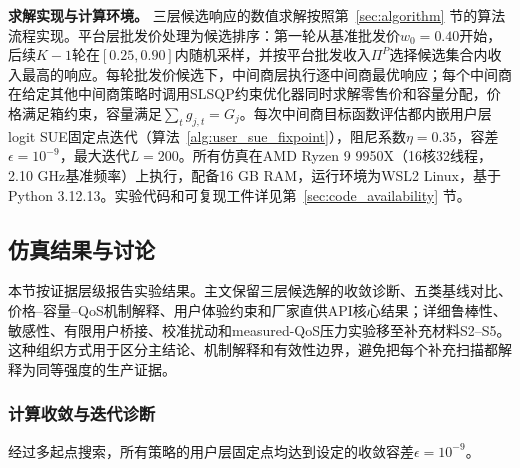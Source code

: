 \documentclass[UTF8,11pt]{ctexart}
\begin{document}
\begin{table}[H]
\centering
\caption{移除中间商层的二层集中优化基准与三层QoS感知策略对比}
\label{tab:cross_layer_baseline}
\small
{}
\end{table}

\textbf{求解实现与计算环境。} 三层候选响应的数值求解按照第~\ref{sec:algorithm} 节的算法流程实现。平台层批发价处理为候选排序：第一轮从基准批发价$w_0=0.40$开始，后续$K-1$轮在$[0.25,0.90]$内随机采样，并按平台批发收入$\Pi^P$选择候选集合内收入最高的响应。每轮批发价候选下，中间商层执行逐中间商最优响应；每个中间商在给定其他中间商策略时调用SLSQP约束优化器同时求解零售价和容量分配，价格满足箱约束，容量满足$\sum_t g_{j,t}=G_j$。每次中间商目标函数评估都内嵌用户层logit SUE固定点迭代（算法~\ref{alg:user_sue_fixpoint}），阻尼系数$\eta=0.35$，容差$\epsilon=10^{-9}$，最大迭代$L=200$。所有仿真在AMD Ryzen 9 9950X（16核32线程，2.10 GHz基准频率）上执行，配备16 GB RAM，运行环境为WSL2 Linux，基于Python 3.12.13。实验代码和可复现工件详见第~\ref{sec:code_availability} 节。

\subsection{仿真结果与讨论}
\label{sec:simulation_results}

本节按证据层级报告实验结果。主文保留三层候选解的收敛诊断、五类基线对比、价格--容量--QoS机制解释、用户体验约束和厂家直供API核心结果；详细鲁棒性、敏感性、有限用户桥接、校准扰动和measured-QoS压力实验移至补充材料S2--S5。这种组织方式用于区分主结论、机制解释和有效性边界，避免把每个补充扫描都解释为同等强度的生产证据。

\subsubsection{计算收敛与迭代诊断}
\label{sec:calculation_convergence}

经过多起点搜索，所有策略的用户层固定点均达到设定的收敛容差$\epsilon=10^{-9}$。
\end{document}
